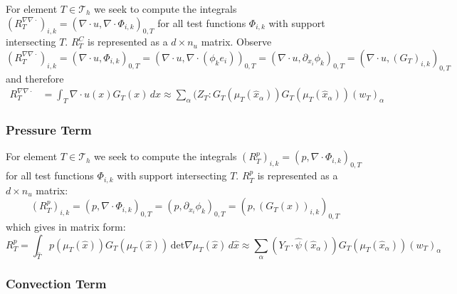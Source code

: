 \documentclass[a4paper,12pt]{article}
\theoremstyle{definition}
\begin{document}
For element $T\in\mathcal{T}_h$ we seek to compute the integrals 
$(R^{\nabla\nabla\cdot}_T)_{i,k} = (\nabla\cdot u,\nabla\cdot\Phi_{i,k})_{0,T}$ for all test functions $\Phi_{i,k}$
with support intersecting $T$. $R^C_T$ is represented as a $d\times n_u$ matrix. Observe
\begin{equation*}
(R^{\nabla\nabla\cdot}_T)_{i,k} = \left(\nabla\cdot u,\Phi_{i,k}\right)_{0,T} 
= \left(\nabla\cdot u,\nabla\cdot(\phi_{k}e_i) \right )_{0,T} 
= \left(\nabla\cdot u, \partial_{x_i}\phi_{k} \right )_{0,T} 
= \left(\nabla\cdot u, (G_T)_{i,k} \right )_{0,T} 
\end{equation*}
and therefore
\begin{equation*}
\begin{split}
R^{\nabla\nabla\cdot}_T &= \int_T \nabla\cdot u(x) G_T(x)  \,dx
\approx \sum_\alpha (Z_T : G_T(\mu_T(\hat x_\alpha)) G_T(\mu_T(\hat x_\alpha)) (w_T)_\alpha
\end{split}
\end{equation*}

\subsubsection*{Pressure Term}

For element $T\in\mathcal{T}_h$ we seek to compute the integrals 
$(R^{p}_T)_{i,k} = ( p, \nabla\cdot\Phi_{i,k})_{0,T}$ for all test functions $\Phi_{i,k}$
with support intersecting $T$. $R^p_T$ is represented as a $d\times n_u$ matrix:
\begin{equation*}
(R^{p}_T)_{i,k} = \left( p,\nabla\cdot\Phi_{i,k}\right)_{0,T} =  \left( p,\partial_{x_i}\phi_{k}\right)_{0,T} 
=  \left( p, (G_T(x))_{i,k} \right)_{0,T}
\end{equation*}
which gives in matrix form:
\begin{equation}
R^{p}_T = \int_{\hat T} p(\mu_T(\hat x)) G_T(\mu_T(\hat x) ) \, \text{det} \nabla\mu_T(\hat x) \,d\hat x
\approx \sum_\alpha (Y_T \cdot \hat\psi(\hat x_\alpha) ) G_T(\mu_T(\hat x_\alpha))  (w_T)_\alpha
\end{equation}

\subsubsection*{Convection Term}
\end{document}
